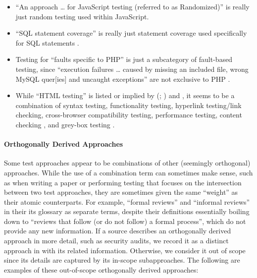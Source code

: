 \begin{itemize}
    \item ``An approach \dots{} for JavaScript testing
          (referred to as Randomized)'' \citep[p.~192]{DoğanEtAl2014} is
          really just random testing used within JavaScript.
    \item ``SQL statement coverage'' is really just statement coverage
          used specifically for SQL statements \citep[Tab.~13]{DoğanEtAl2014}%
          .
    \item Testing for ``faults specific to PHP'' is just a subcategory of
          fault-based testing, since ``execution failures \dots{} caused by
          missing an included file, wrong MySQL quer[ies] and uncaught
          exceptions'' are not exclusive to PHP
          \citep[Tab.~27]{DoğanEtAl2014}.
    \item While ``HTML testing'' is listed or implied by
          \citeauthor{Gerrard2000a} (\citeyear[Tab.~2]{Gerrard2000a};
          \citeyear[Tab.~1, p.~3]{Gerrard2000b}) and
          \citet[p.~220]{Patton2006}, it seems to be a combination of syntax
          testing, functionality testing, hyperlink testing/link checking,
          cross-browser compatibility testing, performance testing,
          content checking \citep[p.~3]{Gerrard2000b}, and grey-box testing
          \citep[pp.~218\==220]{Patton2006}.
\end{itemize}

\paragraph{Orthogonally Derived Approaches}\label{orth-test}
Some test approaches appear to be combinations of other (seemingly
orthogonal) approaches. While the use of a combination term can sometimes
make sense, such as when writing a paper or performing testing that focuses
on the intersection between two test approaches, they are sometimes given
the same ``weight'' as their atomic counterparts. For example, \citetISTQB{}
 ``formal reviews'' and ``informal reviews'' in
\ifnotpaper their \else its \fi glossary as separate terms, despite their
definitions essentially boiling down to ``reviews that follow (or do not
follow) a formal process'', which do not provide any new information.
If a source describes an orthogonally derived approach in more detail, such
as security audits, we record it as a distinct approach in
\ourApproachGlossary{} with its related information. Otherwise, we consider
it out of scope since its details are captured by its in-scope subapproaches.
The following are examples of these out-of-scope orthogonally derived approaches:

